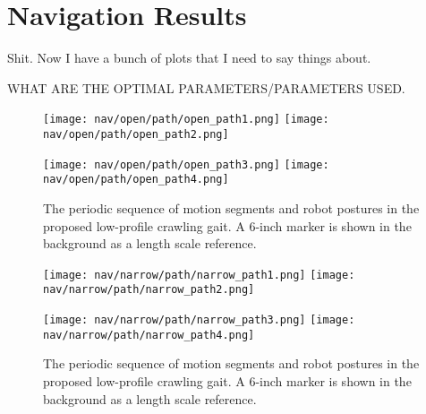 \chapter{Navigation Results} \label{ch:results_navigation}




Shit. Now I have a bunch of plots that I need to say things about.

WHAT ARE THE OPTIMAL PARAMETERS/PARAMETERS USED.

\begin{figure}
  \centerline{
    \texttt{[image: nav/open/path/open\_path1.png]}
    \texttt{[image: nav/open/path/open\_path2.png]}
  }
  \vspace*{0.05in}
  \centerline{
    \texttt{[image: nav/open/path/open\_path3.png]}
    \texttt{[image: nav/open/path/open\_path4.png]}
  }
  \caption{The periodic sequence of motion segments and robot postures in the proposed low-profile crawling gait. A 6-inch marker is shown in the background as a length scale reference.}
  \label{fig:nav_open_frames1}
  \vspace*{-0.07in}
\end{figure}

\begin{figure}
  \centerline{
    \texttt{[image: nav/narrow/path/narrow\_path1.png]}
    \texttt{[image: nav/narrow/path/narrow\_path2.png]}
  }
  \vspace*{0.05in}
  \centerline{
    \texttt{[image: nav/narrow/path/narrow\_path3.png]}
    \texttt{[image: nav/narrow/path/narrow\_path4.png]}
  }
    \caption{The periodic sequence of motion segments and robot postures in the proposed low-profile crawling gait. A 6-inch marker is shown in the background as a length scale reference.}
    \label{fig:nav_narrow_frames1}
        \vspace*{-0.07in}
\end{figure}

